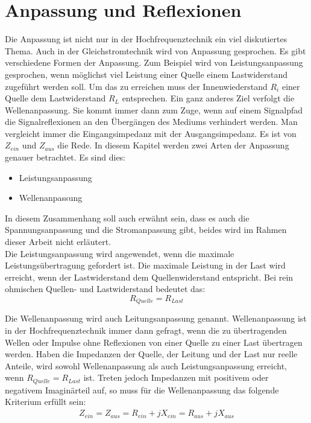 \section{Anpassung und Reflexionen}\label{sec:AnpassungReflexionen}
Die Anpassung ist nicht nur in der Hochfrequenztechnik ein viel diskutiertes Thema. Auch in der Gleichstromtechnik wird von Anpassung gesprochen. Es gibt verschiedene Formen der Anpassung. Zum Beispiel wird von Leistungsanpassung gesprochen, wenn möglichst viel Leistung einer Quelle einem Lastwiderstand zugeführt werden soll. Um das zu erreichen muss der Innenwiederstand  $R_i$ einer Quelle dem Lastwiderstand $R_L$ entsprechen.  Ein ganz anderes Ziel verfolgt die Wellenanpassung. Sie kommt immer dann zum Zuge, wenn auf einem Signalpfad die Signalreflexionen an den Übergängen des Mediums verhindert werden.
Man vergleicht immer die Eingangsimpedanz mit der Ausgangsimpedanz. Es ist  von $Z_{ein}$ und $Z_{aus}$ die Rede.
In diesem Kapitel werden zwei Arten der Anpassung genauer betrachtet. Es sind dies:
\begin{itemize}
\item Leistungsanpassung
\item Wellenanpassung
\end{itemize}
In diesem Zusammenhang soll auch erwähnt sein, dass es auch die Spannungsanpassung und die Stromanpassung gibt, beides wird im Rahmen dieser Arbeit nicht erläutert. \\
Die Leistungsanpassung wird angewendet, wenn die maximale Leistungsübertragung gefordert ist. Die maximale Leistung in der Last wird erreicht, wenn der Lastwiderstand dem Quellenwiderstand entspricht. Bei rein ohmischen Quellen- und Lastwiderstand bedeutet das:\\
\[R_{Quelle} = R_{Last}\]

Die Wellenanpassung wird auch Leitungsanpassung  genannt. Wellenanpassung ist in der Hochfrequenztechnik immer dann gefragt, wenn die zu übertragenden Wellen oder Impulse ohne Reflexionen von einer Quelle zu einer Last übertragen werden. Haben die Impedanzen der Quelle, der Leitung und der Last nur reelle Anteile, wird sowohl Wellenanpassung als auch Leistungsanpassung erreicht, wenn $R_{Quelle} = R_{Last}$ ist. Treten jedoch Impedanzen mit positivem oder negativem Imaginärteil auf, so muss für die Wellenanpassung das folgende Kriterium erfüllt sein: \\
\begin{eqnarray}\label{eq:ZeinZaus}
Z_{ein} = Z_{aus} = R_{ein} +jX_{ein} = R_{aus} + jX_{aus}
\end{eqnarray}



